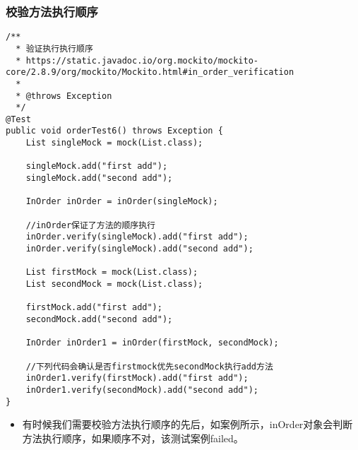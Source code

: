 \documentclass[9pt, b5paper]{article}
\begin{document}
\subsubsection{校验方法执行顺序}
\label{sec-1-1-6}
\begin{verbatim}
/**
  * 验证执行执行顺序
  * https://static.javadoc.io/org.mockito/mockito-core/2.8.9/org/mockito/Mockito.html#in_order_verification
  *
  * @throws Exception
  */
@Test
public void orderTest6() throws Exception {
    List singleMock = mock(List.class);

    singleMock.add("first add");
    singleMock.add("second add");

    InOrder inOrder = inOrder(singleMock);

    //inOrder保证了方法的顺序执行
    inOrder.verify(singleMock).add("first add");
    inOrder.verify(singleMock).add("second add");

    List firstMock = mock(List.class);
    List secondMock = mock(List.class);

    firstMock.add("first add");
    secondMock.add("second add");

    InOrder inOrder1 = inOrder(firstMock, secondMock);

    //下列代码会确认是否firstmock优先secondMock执行add方法
    inOrder1.verify(firstMock).add("first add");
    inOrder1.verify(secondMock).add("second add");
}
\end{verbatim}
\begin{itemize}
\item 有时候我们需要校验方法执行顺序的先后，如案例所示，inOrder对象会判断方法执行顺序，如果顺序不对，该测试案例failed。
\end{itemize}
\end{document}
